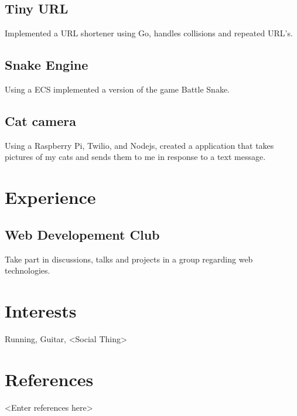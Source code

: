 \documentclass{article}
\begin{document}
\subsection{Tiny URL}

Implemented a URL shortener using Go, handles collisions and repeated URL's.

\subsection{Snake Engine}

Using a ECS implemented a version of the game Battle Snake.

\subsection{Cat camera}

Using a Raspberry Pi, Twilio, and Nodejs, created a application that takes 
pictures of my cats and sends them to me in response to a text message.

\section{Experience}

\subsection{Web Developement Club}

Take part in discussions, talks and projects in a group regarding web 
technologies.

\section{Interests}

Running, Guitar, <Social Thing>

\section{References}

<Enter references here>
\end{document}
